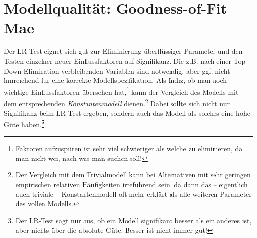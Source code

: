 %
%


\section{\label{sec:gueteDiscr}Modellqualit\"at: Goodness-of-Fit Ma\3e}


Der LR-Test eignet sich gut zur Eliminierung \"uberfl\"ussiger
Parameter und den Testen einzelner neuer Einflussfaktoren auf
Signifikanz. Die z.B. nach einer Top-Down Elimination  verbleibenden
Variablen sind notwendig, aber ggf. nicht hinreichend f\"ur eine
korrekte Modellspezifikation. Als Indiz, ob man noch wichtige
Einflussfaktoren \"ubersehen hat,\footnote{Faktoren aufzusp\"uren ist
sehr viel schwieriger als welche zu eliminieren, da man nicht wei\3, nach was
man suchen soll!} kann der Vergleich des Modells mit
dem entsprechenden \emph{Konstantenmodell} dienen.\footnote{Der
Vergleich mit dem Trivialmodell kann bei Alternativen mit sehr
geringen empirischen relativen
H\"aufigkeiten irref\"uhrend sein, da dann das -- eigentlich auch
triviale -- Konstantenmodell oft mehr erkl\"art als alle weiteren
Parameter des vollen Modells.}
Dabei sollte sich nicht nur Signifikanz beim LR-Test ergeben, sondern
auch das Modell als solches eine hohe G\"ute haben.\footnote{Der LR-Test sagt
nur aus, ob ein Modell signifikant besser als ein anderes ist, aber
nichts \"uber die absolute G\"ute: Besser ist nicht immer gut!}.

